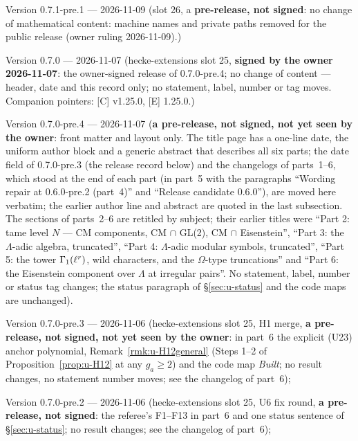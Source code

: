 \documentclass[11pt]{article}
\newcommand{\Iw}{\Lambda}                         %
\begin{document}
Version 0.7.1-pre.1 --- 2026-11-09 (slot 26, a \textbf{pre-release, not signed}: no change of mathematical content: machine names and private paths removed for the public release (owner ruling 2026-11-09).)

Version 0.7.0 --- 2026-11-07 (hecke-extensions slot 25, \textbf{signed by the owner 2026-11-07}: the owner-signed release of 0.7.0-pre.4; no change of content --- header, date and this record only; no statement, label, number or tag moves. Companion pointers: [C] v1.25.0, [E] 1.25.0.)

Version 0.7.0-pre.4 --- 2026-11-07 (\textbf{a pre-release, not signed, not yet seen by the owner}: front matter and layout only. The title page has a one-line date, the uniform author block and a generic abstract that describes all six parts; the date field of 0.7.0-pre.3 (the release record below) and the changelogs of parts~1--6, which stood at the end of each part (in part~5 with the paragraphs ``Wording repair at 0.6.0-pre.2 (part~4)'' and ``Release candidate 0.6.0''), are moved here verbatim; the earlier author line and abstract are quoted in the last subsection. The sections of parts~2--6 are retitled by subject; their earlier titles were ``Part 2: tame level \texorpdfstring{$N$}{N} --- CM components, CM \texorpdfstring{$\cap$}{cap} GL(2), CM \texorpdfstring{$\cap$}{cap} Eisenstein'', ``Part 3: the \texorpdfstring{$\Iw$}{Lambda}-adic algebra, truncated'', ``Part 4: \texorpdfstring{$\Iw$}{Lambda}-adic modular symbols, truncated'', ``Part 5: the tower \texorpdfstring{$\Gamma_1(\ell^{r})$}{Gamma1(l^r)}, wild characters, and the \texorpdfstring{$\Omega$}{Omega}-type truncations'' and ``Part 6: the Eisenstein component over \texorpdfstring{$\Iw$}{Lambda} at irregular pairs''. No statement, label, number or status tag changes; the status paragraph of \S\ref{sec:u-status} and the code maps are unchanged).

Version 0.7.0-pre.3 --- 2026-11-06 (hecke-extensions slot 25, H1 merge, \textbf{a pre-release, not signed, not yet seen by the owner}: in part~6 the explicit (U23) anchor polynomial, Remark~\ref{rmk:u-H12general} (Steps 1--2 of Proposition~\ref{prop:u-H12} at any $g_a\ge2$) and the code map \emph{Built}; no result changes, no statement number moves; see the changelog of part~6);

Version 0.7.0-pre.2 --- 2026-11-06 (hecke-extensions slot 25, U6 fix round, \textbf{a pre-release, not signed}: the referee's F1--F13 in part~6 and one status sentence of \S\ref{sec:u-status}; no result changes; see the changelog of part~6);
\end{document}
